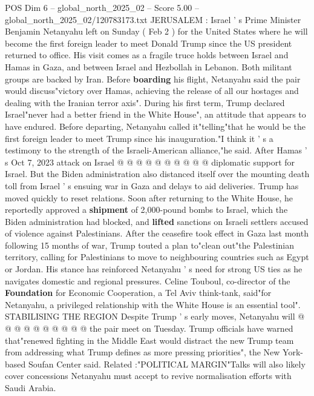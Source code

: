 \begin{textsample}{POS Dim 6 – global\_north\_2025\_02 – Score 5.00 – global\_north\_2025\_02/120783173.txt}  \label{ex:f6_pos_343}
JERUSALEM : Israel ' s Prime Minister Benjamin Netanyahu left on Sunday ( Feb 2 ) for the United States where he will become the first foreign leader to meet Donald Trump since the US president returned to office.
His visit comes as a fragile truce holds between Israel and Hamas in Gaza, and between Israel and Hezbollah in Lebanon.
Both militant groups are backed by Iran.
Before \textbf{boarding} his flight, Netanyahu said the pair would discuss"victory over Hamas, achieving the release of all our hostages and dealing with the Iranian terror axis".
During his first term, Trump declared Israel"never had a better friend in the White House", an attitude that appears to have endured.
Before departing, Netanyahu called it"telling"that he would be the first foreign leader to meet Trump since his inauguration."I think it ' s a testimony to the strength of the Israeli-American alliance,"he said.
After Hamas ' s Oct 7, 2023 attack on Israel @ @ @ @ @ @ @ @ @ @ diplomatic support for Israel.
But the Biden administration also distanced itself over the mounting death toll from Israel ' s ensuing war in Gaza and delays to aid deliveries.
Trump has moved quickly to reset relations.
Soon after returning to the White House, he reportedly approved a \textbf{shipment} of 2,000-pound bombs to Israel, which the Biden administration had blocked, and \textbf{lifted} sanctions on Israeli settlers accused of violence against Palestinians.
After the ceasefire took effect in Gaza last month following 15 months of war, Trump touted a plan to"clean out"the Palestinian territory, calling for Palestinians to move to neighbouring countries such as Egypt or Jordan.
His stance has reinforced Netanyahu ' s need for strong US ties as he navigates domestic and regional pressures.
Celine Touboul, co-director of the \textbf{Foundation} for Economic Cooperation, a Tel Aviv think-tank, said"for Netanyahu, a privileged relationship with the White House is an essential tool".
STABILISING THE REGION Despite Trump ' s early moves, Netanyahu will @ @ @ @ @ @ @ @ @ @ the pair meet on Tuesday.
Trump officials have warned that"renewed fighting in the Middle East would distract the new Trump team from addressing what Trump defines as more pressing priorities", the New York-based Soufan Center said.
Related :"POLITICAL MARGIN"Talks will also likely cover concessions Netanyahu must accept to revive normalisation efforts with Saudi Arabia.

\end{textsample}
